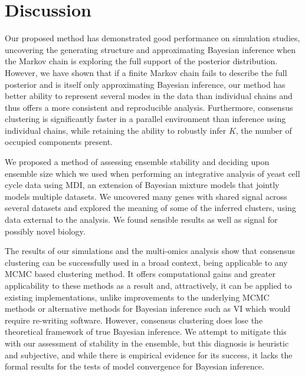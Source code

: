 \documentclass[12pt]{article}
\begin{document}
\section{Discussion}
Our proposed method has demonstrated good performance on simulation studies, uncovering the generating structure and approximating Bayesian inference when the Markov chain is exploring the full support of the posterior distribution. However, we have shown that if a finite Markov chain fails to describe the full posterior and is itself only approximating Bayesian inference, our method has better ability to represent several modes in the data than individual chains and thus offers a more consistent and reproducible analysis. Furthermore, consensus clustering is significantly faster in a parallel environment than inference using individual chains, while retaining the ability to robustly infer $K$, the number of occupied components present. 

We proposed a method of assessing ensemble stability and deciding upon ensemble size which we used when performing an integrative analysis of yeast cell cycle data using MDI, an extension of Bayesian mixture models that jointly models multiple datasets. 
We uncovered many genes with shared signal across several datasets and explored the meaning of some of the inferred clusters, using data external to the analysis. We found sensible results as well as signal for possibly novel biology. 

The results of our simulations and the multi-omics analysis show that consensus clustering can be successfully used in a broad context, being applicable to any MCMC based clustering method. It offers computational gains and greater applicability to these methods as a result and, attractively, it can be applied to existing implementations, unlike improvements to the underlying MCMC methods or alternative methods for Bayesian inference such as VI which would require re-writing software. However, consensus clustering does lose the theoretical framework of true Bayesian inference. We attempt to mitigate this with our assessment of stability in the ensemble, but this diagnosis is heuristic and subjective, and while there is empirical evidence for its success, it lacks the formal results for the tests of model convergence for Bayesian inference.
\end{document}
